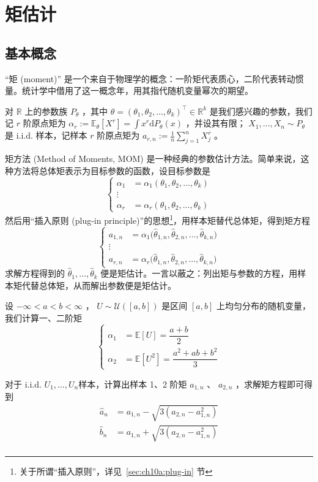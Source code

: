 \section{矩估计}

\subsection{基本概念}

``矩 (moment)'' 是一个来自于物理学的概念：一阶矩代表质心，二阶代表转动惯量。统计学中借用了这一概念年，用其指代随机变量幂次的期望。


对 $\mathbb R$ 上的参数族 $P_\theta$ ，其中 $\theta=(\theta_1,\theta_2,\dots,\theta_k)^\top\in\mathbb R^k$ 是我们感兴趣的参数，我们记 $r$ 阶原点矩为 $\alpha_r:=\mathbb{E}_\theta[X^r]=\int x^r\mathrm{d}P_\theta(x)$ ，并设其有限； $X_1,\dots,X_n\sim P_\theta$是 i.i.d. 样本，记样本 $r$ 阶原点矩为 $a_{r,n}:=\frac1n\sum_{j=1}^nX_{j}^r$ 。

矩方法 (Method of Moments, MOM) 是一种经典的参数估计方法。简单来说，这种方法将总体矩表示为目标参数的函数，设目标参数是
\[ \begin{cases} \alpha_1&=\alpha_1(\theta_1,\theta_2,\dots,\theta_k)\\ \vdots\\ \alpha_r&=\alpha_r(\theta_1,\theta_2,\dots,\theta_k) \end{cases} \]
然后用``插入原则 (plug-in principle)''的思想\footnote{关于所谓``插入原则''，详见~\ref{sec:ch10a:plug-in} 节}，用样本矩替代总体矩，得到矩方程
\[\begin{cases} a_{1,n}&=\alpha_1\big(\widehat\theta_{1,n},\widehat\theta_{2,n},\dots,\widehat\theta_{k,n}\big)\\ \vdots\\ a_{r,n}&=\alpha_r\big(\widehat\theta_{1,n},\widehat\theta_{2,n},\dots,\widehat\theta_{k,n}\big) \end{cases}\]
求解方程得到的 $\widehat\theta_1,\dots,\widehat\theta_k$ 便是矩估计。一言以蔽之：列出矩与参数的方程，用样本矩代替总体矩，从而解出参数便是矩估计。

\begin{example}[均匀分布的矩估计]
设 $-\infty<a<b<\infty$ ， $U\sim \mathcal U([a,b])$ 是区间 $[a,b]$ 上均匀分布的随机变量，我们计算一、二阶矩\[ \begin{cases} \alpha_1&=\mathbb{E}[U]=\dfrac{a+b}{2}\\ \alpha_2&=\mathbb{E}[U^2]=\dfrac{a^2+ab+b^2}{3} \end{cases} \]

对于 i.i.d. $U_1,\dots,U_n$样本，计算出样本 1、2 阶矩 $a_{1,n}$ 、 $a_{2,n}$ ，求解矩方程即可得到
\[\begin{aligned} \widehat{a}_n&=a_{1,n}-\sqrt{3(a_{2,n}-a_{1,n}^2)}\\ \widehat{b}_n&=a_{1,n}+\sqrt{3(a_{2,n}-a_{1,n}^2)}\\  \end{aligned}\]
\end{example}


